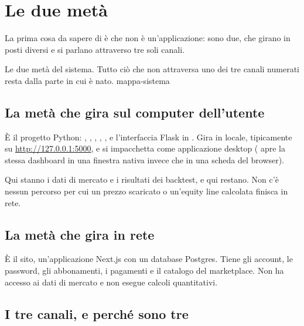 \section{Le due metà}\label{sez:due-meta}

La prima cosa da sapere di \Lyra{} è che non è un'applicazione: sono due, che
girano in posti diversi e si parlano attraverso tre soli canali.

  {Le due metà del sistema. Tutto ciò che non attraversa uno dei tre canali
   numerati resta dalla parte in cui è nato.}
  {mappa-sistema}

\subsection{La metà che gira sul computer dell'utente}

È il progetto Python: \pkgCore, \pkgStrategie, \pkgBacktest, \pkgLive,
\pkgReport, e l'interfaccia Flask in \pkgDashboard. Gira in locale,
tipicamente su \url{http://127.0.0.1:5000}, e si impacchetta come applicazione
desktop ( apre la stessa dashboard in una finestra
nativa invece che in una scheda del browser).

Qui stanno i dati di mercato e i risultati dei backtest, e qui restano. Non
c'è nessun percorso per cui un prezzo scaricato o un'equity line calcolata
finisca in rete.

\subsection{La metà che gira in rete}

È il sito, un'applicazione Next.js con un database Postgres. Tiene gli
account, le password, gli abbonamenti, i pagamenti e il catalogo del
marketplace. Non ha accesso ai dati di mercato e non esegue calcoli
quantitativi.

\subsection{I tre canali, e perché sono tre}

